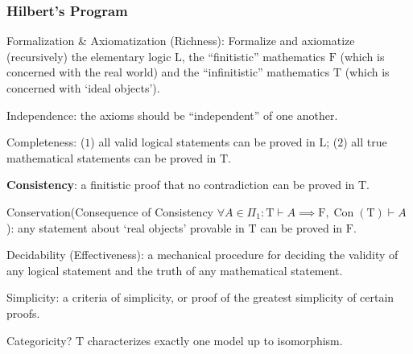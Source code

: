\documentclass[UTF8,aspectratio=43,11pt,colorlinks,compress,openany]{beamer}%
\begin{document}
\begin{frame}\frametitle{Hilbert's Program}
		\begin{enumerate}{\small 
			\item Formalization \& Axiomatization (Richness): Formalize and axiomatize (recursively) the elementary logic $\mathrm{L}$, the ``finitistic'' mathematics $\mathrm{F}$ (which is concerned with the real world) and the ``infinitistic'' mathematics $\mathrm{T}$ (which is concerned with `ideal objects').
			\item Independence: the axioms should be ``independent'' of one another.
			\item Completeness: ($1$) all valid logical statements can be proved in $\mathrm{L}$; ($2$) all true mathematical statements can be proved in $\mathrm{T}$.
			\item \textbf{Consistency}: a finitistic proof that no contradiction can be proved in $\mathrm{T}$.
			\item Conservation({\footnotesize Consequence of Consistency $\forall A\in\Pi_1: \mathrm{T}\vdash A\implies \mathrm{F},\operatorname{Con}(\mathrm{T})\vdash A$}): any statement about `real objects' provable in $\mathrm{T}$ can be proved in $\mathrm{F}$.
			\item Decidability (Effectiveness): a mechanical procedure for deciding the validity of any logical statement and the truth of any mathematical statement.}
			\item Simplicity: a criteria of simplicity, or proof of the greatest simplicity of certain proofs.
			\item Categoricity? $\mathrm{T}$ characterizes exactly one model up to isomorphism.
		\end{enumerate}
\end{frame}
\end{document}
